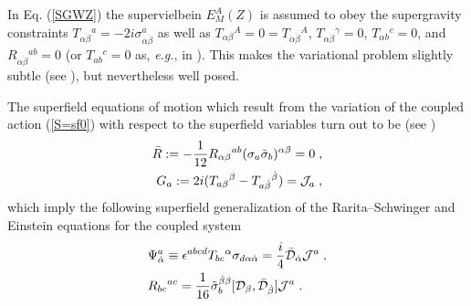 \documentclass[a4paper,11pt]{article}
\begin{document}
 
In Eq. (\ref{SGWZ}) the supervielbein $E_M^A(Z)$ is  
assumed to obey the supergravity constraints
$T_{\alpha \dot{\beta}}{}^a= -2i\sigma^a_{\alpha \dot{\beta}}$
as well as $T_{\alpha\beta}{}^A=0=T_{\dot{\alpha}\dot{\beta}}{}^A$, 
$T_{\alpha\dot{\beta}}{}^{\dot{\gamma}}=0$,  $T_{\alpha b}{}^c=0$, 
and $R_{\alpha\dot{\beta}}{}^{ab}=0$ (or $T_{ab}{}^c=0$ as, {\it e.g.},  
in \cite{BW}).
This makes the variational problem slightly subtle (see \cite{WZ77,BAIL4}), 
but nevertheless well posed. 

The superfield equations of motion 
which result from the variation of the coupled action (\ref{S=sf0}) 
with respect to the superfield variables turn out to be 
(see  \cite{BAIL4})
\begin{eqnarray}
\label{SGeqmR}
\bar{R}:= -{1\over 12} R_{{\alpha}{\beta}}{}^{ab} 
(\sigma_a \tilde{\sigma}_b)^{{\alpha}{\beta}}=0 \; , 
\\ 
\label{Ga=Ja}
 G_a:= 2i (T_{a\beta}{}^\beta -T_{a\dot{\beta}}{}^{\dot{\beta}})
= {\cal J}_a 
\; ,  
\end{eqnarray} 
which imply the following superfield generalization of the 
Rarita--Schwinger and Einstein   equations for the coupled system 
\begin{eqnarray}\label{SGRS=J1}
& \Psi^a_{\dot\alpha}  \equiv 
\epsilon^{abcd}T_{bc}{}^{\alpha}\sigma_{d\alpha\dot{\alpha}}= 
{i\over 4} \bar{{\cal D}}_{\dot{\alpha}}
{\cal J}^a   \; ,
\\ \label{EiInt1} 
& R_{bc}{}^{ac} = {1\over 16} 
\tilde{\sigma}_b^{\dot{\beta}\beta} [{\cal D}_{\beta}, 
\bar{{\cal D}}_{\dot{\beta}}] {\cal J}^a \; .
\end{eqnarray}
\end{document}

